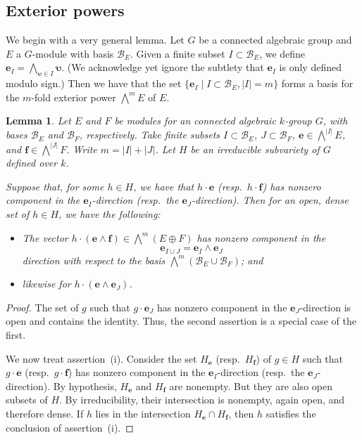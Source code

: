 \documentclass{amsart}
\theoremstyle{plain}
\newtheorem{lemma}[theorem]{Lemma}
\theoremstyle{definition}
\theoremstyle{remark}
\newcommand{\Vect}[1]{\mathbold{#1}}
\providecommand{\abs}[1]{\lvert#1\rvert}
\begin{document}
\subsection{Exterior powers}\label{sec:ExteriorPowers}
We begin with a very general lemma. Let $G$ be a connected
algebraic group and $E$ a $G$-module with basis $\mathscr{B}_{E}$.
Given a finite subset $I \subset \mathscr{B}_{E}$, we define
$\Vect{e}_{I} = \bigwedge_{\Vect{\upsilon} \in I}
\Vect{\upsilon}$. (We acknowledge yet ignore the subtlety that
$\Vect{e}_{I}$ is only defined modulo sign.) Then we have that the
set $\{\Vect{e}_{I} \mid I \subset \mathscr{B}_{E}, \abs{I} = m\}$
forms a basis for the $m$-fold exterior power
$\textstyle{\bigwedge^{\!m}} E$ of $E$.
\begin{lemma}\label{lem:indexsetdecomposition}
Let $E$ and $F$ be modules for an connected algebraic $k$-group
$G$, with bases $\mathscr{B}_{E}$ and $\mathscr{B}_{F}$,
respectively. Take finite subsets $I \subset \mathscr{B}_{E}$, $J \subset
\mathscr{B}_{F}$, $\Vect{e} \in \textstyle{\bigwedge^{\!\abs{I}}} E$, and
$\Vect{f} \in \textstyle{\bigwedge^{\!\abs{J}}} F$. Write $m = \abs{I} + \abs{J}$. Let $H$ be an irreducible
subvariety of $G$ defined over $k$.

Suppose that, for some $h \in H$, we have that $h \cdot \Vect{e}$
(resp.\ $h \cdot \Vect{f}$) has nonzero component in the
$\Vect{e}_{I}$-direction (resp.\ the $\Vect{e}_{J}$-direction).
Then for an open, dense set of $h \in H$, we have the following:
\begin{itemize}
\item[(i)] The vector
$h \cdot (\Vect{e} \wedge \Vect{f}) \in \textstyle{\bigwedge^{\!m}} (E \oplus F)$ has
nonzero component in the
$$\Vect{e}_{I \cup J} = \Vect{e}_{I} \wedge
\Vect{e}_{J}$$ direction with respect to the basis $\textstyle{\bigwedge^{\!m}} (\mathscr{B}_{E} 
\cup \mathscr{B}_{F})$; and \item[(ii)] likewise for $h \cdot
(\Vect{e} \wedge \Vect{e}_{J})$.
\end{itemize}
\end{lemma}
\begin{proof}
The set of $g$ such that $g \cdot \Vect{e}_{J}$ has nonzero component in the
$\Vect{e}_{J}$-direction is open and contains the identity. Thus, the second assertion is
a special case of the first.

We now treat assertion~(i). Consider the set $H_{\Vect{e}}$ (resp.\ $H_{\Vect{f}}$) of $g
\in H$ such that $g \cdot \Vect{e}$ (resp.\ $g \cdot \Vect{f}$) has nonzero component in
the $\Vect{e}_{I}$-direction (resp.\ the $\Vect{e}_{J}$-direction). By hypothesis, $H_{\Vect{e}}$
and $H_{\Vect{f}}$ are nonempty. But they are also open subsets of $H$. By irreducibility,
their intersection is nonempty, again open, and therefore dense. If $h$ lies in the
intersection $H_{\Vect{e}} \cap H_{\Vect{f}}$, then $h$ satisfies the conclusion of assertion~(i).
\end{proof}
\end{document}
